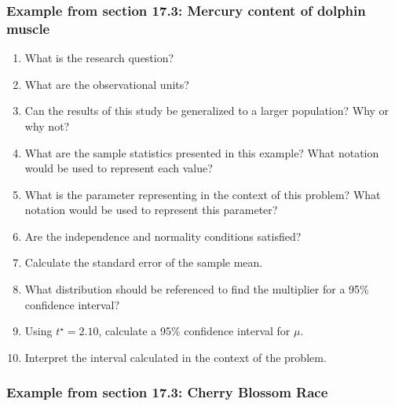 \documentclass[
]{report}
\newcommand{\rgs}{\vspace{12pt}} %
\begin{document}
\hypertarget{example-from-section-17.3-mercury-content-of-dolphin-muscle}{%
\subsubsection*{Example from section 17.3: Mercury content of dolphin muscle}\label{example-from-section-17.3-mercury-content-of-dolphin-muscle}}

\begin{enumerate}
\def\labelenumi{\arabic{enumi}.}
\item
  What is the research question?
  \rgs 
\item
  What are the observational units?
  \rgs 
\item
  Can the results of this study be generalized to a larger population? Why or why not?
  \rgs 
\item
  What are the sample statistics presented in this example? What notation would be used to represent each value?
  \rgs 
\item
  What is the parameter representing in the context of this problem? What notation would be used to represent this parameter?
  \rgs 
  \rgs 
\item
  Are the independence and normality conditions satisfied?
  \rgs 
  \rgs 
\item
  Calculate the standard error of the sample mean.
  \rgs 
  \rgs
\item
  What distribution should be referenced to find the multiplier for a 95\% confidence interval?
  \rgs 
\item
  Using \(t^\star=2.10\), calculate a 95\% confidence interval for \(\mu\).
  \rgs 
  \rgs
\item
  Interpret the interval calculated in the context of the problem.
  \rgs 
  \rgs 
\end{enumerate}

\hypertarget{example-from-section-17.3-cherry-blossom-race}{%
\subsubsection*{Example from section 17.3: Cherry Blossom Race}\label{example-from-section-17.3-cherry-blossom-race}}
\end{document}
